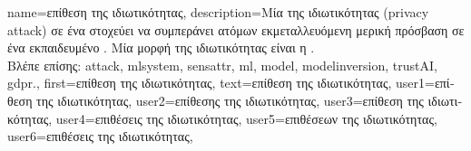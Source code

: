 {name={\foreignlanguage{greek}{επίθεση της ιδιωτικότητας}},
	description={\foreignlanguage{greek}{Μία}  
		\foreignlanguage{greek}{της ιδιωτικότητας} (privacy attack) \foreignlanguage{greek}{σε ένα}  
		\foreignlanguage{greek}{στοχεύει να συμπεράνει}  \foreignlanguage{greek}{ατόμων εκμεταλλευόμενη 
		μερική πρόσβαση σε ένα εκπαιδευμένο}  . \foreignlanguage{greek}{Μία μορφή} 
		 \foreignlanguage{greek}{της ιδιωτικότητας εί\-ναι η} .
		\\
		\foreignlanguage{greek}{Βλέπε επίσης:} \gls{attack}, \gls{mlsystem}, \gls{sensattr}, \gls{ml}, \gls{model}, \gls{modelinversion}, 
		\gls{trustAI}, \gls{gdpr}.},
	first={\foreignlanguage{greek}{επίθεση της ιδιωτικότητας}},
	text={\foreignlanguage{greek}{επίθεση της ιδιωτικότητας}},
	user1={\foreignlanguage{greek}{επίθεση της ιδιωτικότητας}}, %
  	user2={\foreignlanguage{greek}{επίθεσης της ιδιωτικότητας}}, %
	user3={\foreignlanguage{greek}{επίθεση της ιδιωτικότητας}}, %
  	user4={\foreignlanguage{greek}{επιθέσεις της ιδιωτικότητας}}, %
	user5={\foreignlanguage{greek}{επιθέσεων της ιδιωτικότητας}}, %
	user6={\foreignlanguage{greek}{επιθέσεις της ιδιωτικότητας}}, %
}

